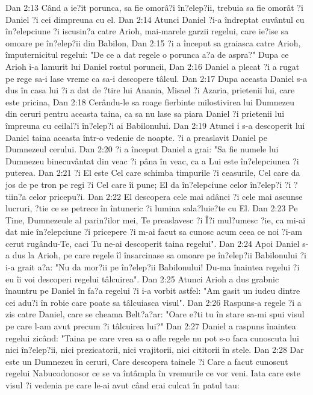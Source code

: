 Dan 2:13  Când a ie?it porunca, sa fie omorâ?i în?elep?ii, trebuia sa fie omorât ?i Daniel ?i cei dimpreuna cu el.
Dan 2:14  Atunci Daniel ?i-a îndreptat cuvântul cu în?elepciune ?i iscusin?a catre Arioh, mai-marele garzii regelui, care ie?ise sa omoare pe în?elep?ii din Babilon,
Dan 2:15  ?i a început sa graiasca catre Arioh, împuternicitul regelui: "De ce a dat regele o porunca a?a de aspra?" Dupa ce Arioh i-a lamurit lui Daniel rostul poruncii,
Dan 2:16  Daniel a plecat ?i a rugat pe rege sa-i lase vreme ca sa-i descopere tâlcul.
Dan 2:17  Dupa aceasta Daniel s-a dus în casa lui ?i a dat de ?tire lui Anania, Misael ?i Azaria, prietenii lui, care este pricina,
Dan 2:18  Cerându-le sa roage fierbinte milostivirea lui Dumnezeu din ceruri pentru aceasta taina, ca sa nu lase sa piara Daniel ?i prietenii lui împreuna cu ceilal?i în?elep?i ai Babilonului.
Dan 2:19  Atunci i s-a descoperit lui Daniel taina aceasta într-o vedenie de noapte. ?i a preaslavit Daniel pe Dumnezeul cerului.
Dan 2:20  ?i a început Daniel a grai: "Sa fie numele lui Dumnezeu binecuvântat din veac ?i pâna în veac, ca a Lui este în?elepciunea ?i puterea.
Dan 2:21  ?i El este Cel care schimba timpurile ?i ceasurile, Cel care da jos de pe tron pe regi ?i Cel care îi pune; El da în?elepciune celor în?elep?i ?i ?tiin?a celor pricepu?i.
Dan 2:22  El descopera cele mai adânci ?i cele mai ascunse lucruri, ?tie ce se petrece în întuneric ?i lumina sala?luie?te cu El.
Dan 2:23  Pe Tine, Dumnezeule al parin?ilor mei, Te preaslavesc ?i Î?i mul?umesc ?ie, ca mi-ai dat mie în?elepciune ?i pricepere ?i m-ai facut sa cunosc acum ceea ce noi ?i-am cerut rugându-Te, caci Tu ne-ai descoperit taina regelui".
Dan 2:24  Apoi Daniel s-a dus la Arioh, pe care regele îl însarcinase sa omoare pe în?elep?ii Babilonului ?i i-a grait a?a: "Nu da mor?ii pe în?elep?ii Babilonului! Du-ma înaintea regelui ?i eu îi voi descoperi regelui tâlcuirea".
Dan 2:25  Atunci Arioh a dus grabnic înauntru pe Daniel în fa?a regelui ?i i-a vorbit astfel: "Am gasit un iudeu dintre cei adu?i în robie care poate sa tâlcuiasca visul".
Dan 2:26  Raspuns-a regele ?i a zis catre Daniel, care se cheama Belt?a?ar: "Oare e?ti tu în stare sa-mi spui visul pe care l-am avut precum ?i tâlcuirea lui?"
Dan 2:27  Daniel a raspuns înaintea regelui zicând: "Taina pe care vrea sa o afle regele nu pot s-o faca cunoscuta lui nici în?elep?ii, nici prezicatorii, nici vrajitorii, nici cititorii în stele.
Dan 2:28  Dar este un Dumnezeu în ceruri, Care descopera tainele ?i Care a facut cunoscut regelui Nabucodonosor ce se va întâmpla în vremurile ce vor veni. Iata care este visul ?i vedenia pe care le-ai avut când erai culcat în patul tau:
